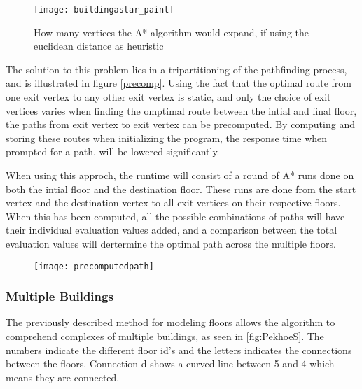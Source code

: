 \begin{figure}[ht!]
    \centering
    \texttt{[image: buildingastar\_paint]}
    \caption{How many vertices the A* algorithm would expand, if using the euclidean distance as heuristic}
    \label{fig:buildingAstar}
  \end{figure}

The solution to this problem lies in a tripartitioning of the pathfinding process, and is illustrated in figure \ref{precomp}. Using the fact that the optimal route from one exit vertex to any other exit vertex is static, and only the choice of exit vertices varies when finding the omptimal route between the intial and final floor, the paths from exit vertex to exit vertex can be precomputed. By computing and storing these routes when initializing the program, the response time when prompted for a path, will be lowered significantly.

When using this approch, the runtime will consist of a round of A* runs done on both the intial floor and the destination floor. These runs are done from the start vertex and the destination vertex to all exit vertices on their respective floors. When this has been computed, all the possible combinations of paths will have their individual evaluation values added, and a comparison between the total evaluation values will dertermine the optimal path across the multiple floors.

\begin{figure}[ht!]
    \centering
    \texttt{[image: precomputedpath]}
    \caption{}
    \label{fig:precomp}
  \end{figure}

\subsubsection{Multiple Buildings}

The previously described method for modeling floors allows the algorithm to comprehend complexes of multiple buildings, as seen in \cref{fig:PekhoeS}. The numbers indicate the different floor id's and the letters indicates the connections between the floors. Connection d shows a curved line between 5 and 4 which means they are connected.\newline

